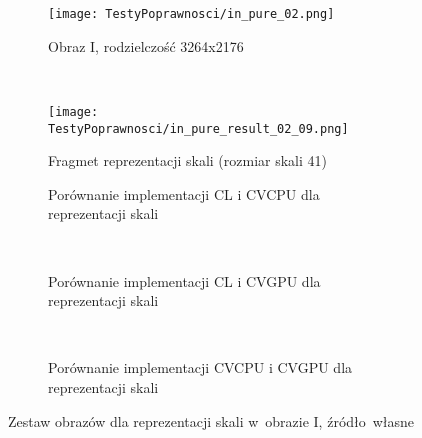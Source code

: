 \begin{figure}[H]

\begin{center}
\begin{subfigure}[t]{0.3\textwidth}
\texttt{[image: TestyPoprawnosci/in\_pure\_02.png]}
\caption{Obraz I, rodzielczość 3264x2176}
\label{fig:valPure02}
\end{subfigure}
~
\begin{subfigure}[t]{0.3\textwidth}
\texttt{[image: TestyPoprawnosci/in\_pure\_result\_02\_09.png]}
\caption{Fragmet reprezentacji skali (rozmiar skali 41)}
\label{fig:valPureResult02}
\end{subfigure}
\end{center}

\begin{subfigure}[t]{0.3\textwidth}
	\centering
	\setlength\fboxsep{0pt}
	\setlength\fboxrule{0.5pt}
	\caption{Porównanie implementacji CL i CVCPU dla reprezentacji skali}
	\label{fig:valPure2CLCVCPU}
\end{subfigure}
~
\begin{subfigure}[t]{0.3\textwidth}
	\centering
	\setlength\fboxsep{0pt}
	\setlength\fboxrule{0.5pt}
	\caption{Porównanie implementacji CL i CVGPU dla reprezentacji skali}
	\label{fig:valPure2CLCVGPU}
\end{subfigure}
~
\begin{subfigure}[t]{0.3\textwidth}
	\centering
	\setlength\fboxsep{0pt}
	\setlength\fboxrule{0.5pt}
	\caption{Porównanie implementacji CVCPU i CVGPU dla reprezentacji skali}
	\label{fig:valPure2CVCPUCVGPU}                 
\end{subfigure}
\caption{Zestaw obrazów dla reprezentacji skali w~obrazie I, \tiny{źródło~własne}}

\label{fig:valPure2}
\end{figure}

